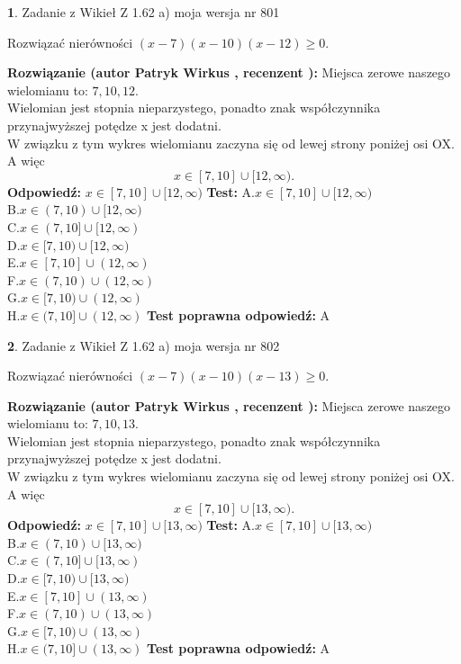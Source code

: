 \documentclass[12pt, a4paper]{article}
\theoremstyle{definition} %
\newtheorem{zad}{}
\newcommand{\zadStart}[1]{\begin{zad}#1\newline}
\newcommand{\zadStop}{\end{zad}}
\newcommand{\rozwStart}[2]{\noindent \textbf{Rozwiązanie (autor #1 , recenzent #2): }\newline}
\newcommand{\rozwStop}{\newline}
\newcommand{\odpStart}{\noindent \textbf{Odpowiedź:}\newline}
\newcommand{\odpStop}{\newline}
\newcommand{\testStart}{\noindent \textbf{Test:}\newline}
\newcommand{\testStop}{\newline}
\newcommand{\kluczStart}{\noindent \textbf{Test poprawna odpowiedź:}\newline}
\newcommand{\kluczStop}{\newline}
\begin{document}
\zadStart{Zadanie z Wikieł Z 1.62 a) moja wersja nr 801}

Rozwiązać nierówności $(x-7)(x-10)(x-12)\ge0$.
\zadStop
\rozwStart{Patryk Wirkus}{}
Miejsca zerowe naszego wielomianu to: $7, 10, 12$.\\
Wielomian jest stopnia nieparzystego, ponadto znak współczynnika przy\linebreak najwyższej potędze x jest dodatni.\\ W związku z tym wykres wielomianu zaczyna się od lewej strony poniżej osi OX. A więc $$x \in [7,10] \cup [12,\infty).$$
\rozwStop
\odpStart
$x \in [7,10] \cup [12,\infty)$
\odpStop
\testStart
A.$x \in [7,10] \cup [12,\infty)$\\
B.$x \in (7,10) \cup [12,\infty)$\\
C.$x \in (7,10] \cup [12,\infty)$\\
D.$x \in [7,10) \cup [12,\infty)$\\
E.$x \in [7,10] \cup (12,\infty)$\\
F.$x \in (7,10) \cup (12,\infty)$\\
G.$x \in [7,10) \cup (12,\infty)$\\
H.$x \in (7,10] \cup (12,\infty)$
\testStop
\kluczStart
A
\kluczStop



\zadStart{Zadanie z Wikieł Z 1.62 a) moja wersja nr 802}

Rozwiązać nierówności $(x-7)(x-10)(x-13)\ge0$.
\zadStop
\rozwStart{Patryk Wirkus}{}
Miejsca zerowe naszego wielomianu to: $7, 10, 13$.\\
Wielomian jest stopnia nieparzystego, ponadto znak współczynnika przy\linebreak najwyższej potędze x jest dodatni.\\ W związku z tym wykres wielomianu zaczyna się od lewej strony poniżej osi OX. A więc $$x \in [7,10] \cup [13,\infty).$$
\rozwStop
\odpStart
$x \in [7,10] \cup [13,\infty)$
\odpStop
\testStart
A.$x \in [7,10] \cup [13,\infty)$\\
B.$x \in (7,10) \cup [13,\infty)$\\
C.$x \in (7,10] \cup [13,\infty)$\\
D.$x \in [7,10) \cup [13,\infty)$\\
E.$x \in [7,10] \cup (13,\infty)$\\
F.$x \in (7,10) \cup (13,\infty)$\\
G.$x \in [7,10) \cup (13,\infty)$\\
H.$x \in (7,10] \cup (13,\infty)$
\testStop
\kluczStart
A
\kluczStop
\end{document}
